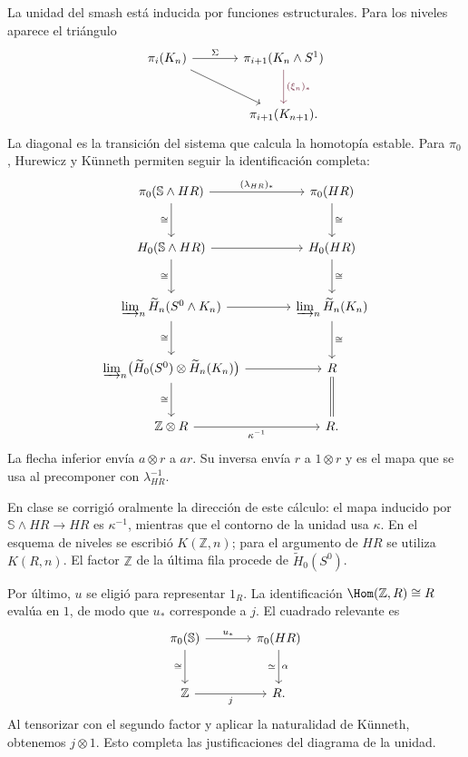 La unidad del smash está inducida por funciones estructurales. Para los niveles aparece el triángulo
\[
\begin{tikzcd}[column sep=large,row sep=large]
\pi_i(K_n)\arrow[r,"\Sigma"]\arrow[dr]&
\pi_{i+1}(K_n\wedge S^1)\arrow[d,"(\xi_n)_*",rojoCIMAT]\\
&\pi_{i+1}(K_{n+1}).
\end{tikzcd}
\]
La diagonal es la transición del sistema que calcula la homotopía estable. Para $\pi_0$, Hurewicz y Künneth permiten seguir la identificación completa:
\[
\begin{tikzcd}[column sep=large,row sep=large]
\pi_0(\mathbb S\wedge HR)\arrow[r,"(\lambda_{HR})_*"]\arrow[d,"\cong"']&
\pi_0(HR)\arrow[d,"\cong"]\\
H_0(\mathbb S\wedge HR)\arrow[r]\arrow[d,"\cong"']&H_0(HR)\arrow[d,"\cong"]\\
\varinjlim\nolimits_n\widetilde H_n(S^0\wedge K_n)\arrow[r]\arrow[d,"\cong"']&
\varinjlim\nolimits_n\widetilde H_n(K_n)\arrow[d,"\cong"]\\
\varinjlim\nolimits_n\bigl(\widetilde H_0(S^0)\otimes\widetilde H_n(K_n)\bigr)
 \arrow[r]\arrow[d,"\cong"']&R\arrow[d,equal]\\
\mathbb Z\otimes R\arrow[r,"\kappa^{-1}"']&R.
\end{tikzcd}
\]
La flecha inferior envía $a\otimes r$ a $ar$. Su inversa envía $r$ a $1\otimes r$ y es el mapa que se usa al precomponer con $\lambda_{HR}^{-1}$.

\begin{nota}
En clase se corrigió oralmente la dirección de este cálculo: el mapa inducido por $\mathbb S\wedge HR\to HR$ es $\kappa^{-1}$, mientras que el contorno de la unidad usa $\kappa$. En el esquema de niveles se escribió $K(\mathbb Z,n)$; para el argumento de $HR$ se utiliza $K(R,n)$. El factor $\mathbb Z$ de la última fila procede de $\widetilde H_0(S^0)$.
\end{nota}

Por último, $u$ se eligió para representar $1_R$. La identificación $\Hom(\mathbb Z,R)\cong R$ evalúa en $1$, de modo que $u_*$ corresponde a $j$. El cuadrado relevante es
\[
\begin{tikzcd}[column sep=large,row sep=large]
\pi_0(\mathbb S)\arrow[r,"u_*"]\arrow[d,"\cong"']&\pi_0(HR)\arrow[d,"\alpha","\simeq"']\\
\mathbb Z\arrow[r,"j"']&R.
\end{tikzcd}
\]
Al tensorizar con el segundo factor y aplicar la naturalidad de Künneth, obtenemos $j\otimes1$. Esto completa las justificaciones del diagrama de la unidad.

